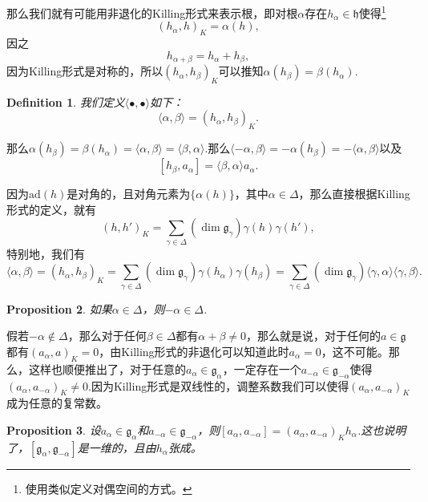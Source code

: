 \documentclass[8pt]{book}
\theoremstyle{plain}
\newtheorem{defi}{Definition}
\newtheorem{pro}[defi]{Proposition}
\newcommand{\lag}{{\mathfrak{g}}}  %
\newcommand{\ad}{{\mathrm{ad}}}
\begin{document}
那么我们就有可能用非退化的Killing形式来表示根，即对根$\alpha$存在$h_\alpha\in\mathfrak{h}$使得\footnote{使用类似定义对偶空间的方式。}
\[
	(h_\alpha,h)_K=\alpha(h),
\]
因之
\[
	h_{\alpha+\beta}=h_\alpha+h_\beta,
\]
因为Killing形式是对称的，所以$(h_\alpha,h_\beta)_K$可以推知$\alpha(h_\beta)=\beta(h_\alpha)$.
\begin{defi}
我们定义$\langle \bullet,\bullet \rangle$如下：
\[
	\langle \alpha,\beta \rangle=(h_\alpha,h_\beta)_K.
\]
\end{defi}
那么$\alpha(h_\beta)=\beta(h_\alpha)=\langle \alpha,\beta \rangle=\langle \beta,\alpha \rangle$.那么$\langle -\alpha,\beta \rangle=-\alpha(h_\beta)=-\langle \alpha,\beta \rangle$以及
\[
	[h_\beta,a_\alpha]=\langle \beta,\alpha \rangle a_\alpha.
\]

因为$\ad(h)$是对角的，且对角元素为$\{\alpha(h)\}$，其中$\alpha\in\Delta$，那么直接根据Killing形式的定义，就有
\[
	(h,h')_K=\sum_{\gamma \in \Delta}(\dim \lag_\gamma)\gamma(h)\gamma(h'),
\]
特别地，我们有
\[
	\langle \alpha,\beta \rangle=(h_\alpha,h_\beta)_K=\sum_{\gamma \in \Delta}(\dim \lag_\gamma)\gamma(h_\alpha)\gamma(h_\beta)=\sum_{\gamma \in \Delta}(\dim \lag_\gamma)\langle \gamma,\alpha\rangle\langle \gamma,\beta\rangle.
\]

\begin{pro}
如果$\alpha\in\Delta$，则$-\alpha\in\Delta$.
\end{pro}
假若$-\alpha\notin\Delta$，那么对于任何$\beta\in\Delta$都有$\alpha+\beta\neq 0$，那么就是说，对于任何的$a\in \lag$都有$(a_\alpha,a)_K=0$，由Killing形式的非退化可以知道此时$a_\alpha=0$，这不可能。那么，这样也顺便推出了，对于任意的$a_\alpha\in\lag_{\alpha}$，一定存在一个$a_{-\alpha}\in\lag_{-\alpha}$使得$(a_\alpha,a_{-\alpha})_K\neq 0$.因为Killing形式是双线性的，调整系数我们可以使得$(a_\alpha,a_{-\alpha})_K$成为任意的复常数。

\begin{pro}
设$a_\alpha \in \lag_\alpha$和$a_{-\alpha} \in \lag_{-\alpha}$，则$[a_{\alpha},a_{-\alpha}]=(a_{\alpha},a_{-\alpha})_Kh_\alpha$.这也说明了，$[\lag_{\alpha},\lag_{-\alpha}]$是一维的，且由$h_\alpha$张成。
\end{pro}
\end{document}
